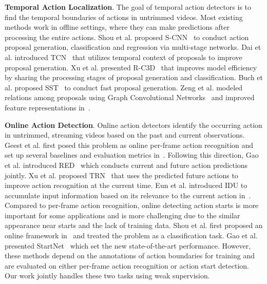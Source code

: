 \documentclass[final]{cvpr}
\begin{document}
\textbf{Temporal Action Localization}.
The goal of temporal action detectors is to find the temporal boundaries of actions in untrimmed videos. Most existing methods work in offline settings, where they can make predictions after processing the entire actions. Shou et al. proposed S-CNN~\cite{shou2016temporal} to conduct action proposal generation, classification and regression via multi-stage networks. Dai et al. introduced TCN~\cite{dai2017temporal} that utilizes temporal context of proposals to improve proposal generation. Xu et al. presented R-C3D~\cite{xu2017r} that improves model efficiency by sharing the processing stages of proposal generation and classification. Buch et al. proposed SST~\cite{buch2017sst} to conduct fast proposal generation. Zeng et al. modeled relations among proposals using Graph Convolutional Networks~\cite{kipf2016semi} and improved feature representations in~\cite{zeng2019graph}.

\textbf{Online Action Detection}.
Online action detectors identify the occurring action in untrimmed, streaming videos based on the past and current observations. Geest et al. first posed this problem as online per-frame action recognition and set up several baselines and evaluation metrics in~\cite{de2016online}. Following this direction, Gao et al. introduced RED~\cite{gao2017red} which conducts current and future action predictions jointly. Xu et al. proposed TRN~\cite{xu2019trn} that uses the predicted future actions to improve action recognition at the current time. Eun et al. introduced IDU to accumulate input information based on its relevance to the current action in~\cite{eun2020idu}. Compared to per-frame action recognition, online detecting action starts is more important for some applications and is more challenging due to the similar appearance near starts and the lack of training data. Shou et al. first proposed an online framework in~\cite{shou2018online} and treated the problem as a classification task. Gao et al. presented StartNet~\cite{gao2019startnet} which set the new state-of-the-art performance. However, these methods depend on the annotations of action boundaries for training and are evaluated on either per-frame action recognition or action start detection. Our work jointly handles these two tasks using weak supervision.
\end{document}
